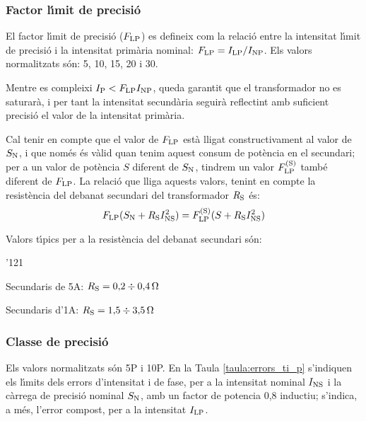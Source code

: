 \subsubsection{Factor l\'{\i}mit de precisi\'{o}}

 El factor l\'{\i}mit de precisi\'{o}
($F_\mathrm{LP}$) es defineix com la relaci\'{o} entre la intensitat l\'{\i}mit de precisi\'{o}
i la intensitat prim\`{a}ria nominal: $F_\mathrm{LP} = I_\mathrm{LP} /I_\mathrm{NP}$.
Els valors normalitzats s\'{o}n: 5, 10, 15, 20 i 30.

Mentre es compleixi  $I_\mathrm{P}<F_\mathrm{LP} I_\mathrm{NP}$, queda garantit
que el transformador no es saturar\`{a}, i per tant la intensitat
secund\`{a}ria seguir\`{a} reflectint amb suficient precisi\'{o} el valor de la
intensitat prim\`{a}ria.

Cal tenir en compte que el valor de $F_\mathrm{LP}$ est\`{a} lligat
constructivament al valor de $S_\mathrm{N}$, i que nom\'{e}s \'{e}s v\`{a}lid quan
tenim aquest consum de  pot\`{e}ncia en el secundari; per a un valor de
pot\`{e}ncia $S$ diferent de $S_\mathrm{N}$, tindrem un valor
$F_\mathrm{LP}^\mathrm{(S)}$ tamb\'{e} diferent de  $F_\mathrm{LP}$. La relaci\'{o} que
lliga aquests valors, tenint en compte la resist\`{e}ncia del debanat
secundari del transformador  $R_\mathrm{S}$ \'{e}s:
\begin{equation}\label{eq:flp}
    F_\mathrm{LP} (S_\mathrm{N}+R_\mathrm{S}I_\mathrm{NS}^2) =
    F_\mathrm{LP}^\mathrm{(S)} (S+R_\mathrm{S}I_\mathrm{NS}^2)
\end{equation}

Valors t\'{\i}pics per a la resist\`{e}ncia del debanat secundari s\'{o}n:
\begin{dinglist}{'121}
    \item Secundaris de 5\unit{A}: $R_\mathrm{S} = 0{,}2\div 0{,}4\mathrm{\,\mathrm{\Omega}}$
    \item Secundaris d'1\unit{A}:  $R_\mathrm{S} = 1{,}5 \div3{,}5\mathrm{\,\mathrm{\Omega}}$
\end{dinglist}

\subsubsection{Classe de precisi\'{o}}

 Els valors normalitzats s\'{o}n 5P i 10P.
En la Taula \vref{taula:errors_ti_p} s'indiquen els l\'{\i}mits dels
errors d'intensitat i de fase,  per a la intensitat nominal
$I_\mathrm{NS}$ i  la c\`{a}rrega de precisi\'{o} nominal $S_\mathrm{N}$,  amb un
factor de potencia 0,8 inductiu; s'indica, a m\'{e}s, l'error
compost, per a la intensitat $I_\mathrm{LP}$.

